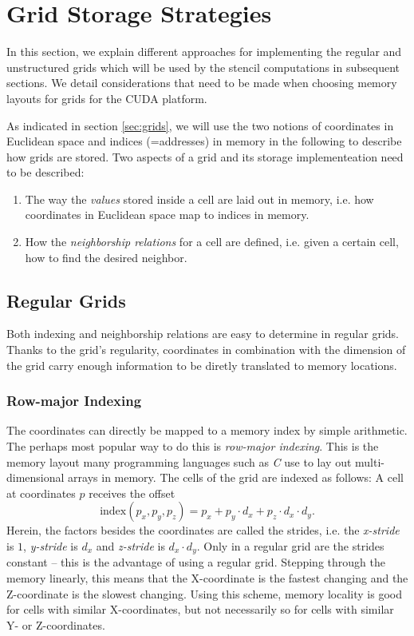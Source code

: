 \section{Grid Storage Strategies}				\label{sec:grid-implementations}

In this section, we explain different approaches for implementing the regular and unstructured grids which will be used by the stencil computations in subsequent sections. We detail considerations that need to be made when choosing memory layouts for grids for the CUDA platform.

As indicated in section \ref{sec:grids}, we will use the two notions of coordinates in Euclidean space and indices (=addresses) in memory in the following to describe how grids are stored. Two aspects of a grid and its storage implementeation need to be described:
\begin{enumerate}
	\item The way the \emph{values} stored inside a cell are laid out in memory, i.e. how coordinates in Euclidean space map to indices in memory.
	\item How the \emph{neighborship relations} for a cell are defined, i.e. given a certain cell, how to find the desired neighbor.
\end{enumerate}

\subsection{Regular Grids}

Both indexing and neighborship relations are easy to determine in regular grids. Thanks to the grid's regularity, coordinates in combination with the dimension of the grid carry enough information to be diretly translated to memory locations.

\subsubsection{Row-major Indexing}

The coordinates can directly be mapped to a memory index by simple arithmetic. The perhaps most popular way to do this is \emph{row-major indexing}. This is the memory layout many programming languages such as \emph{C} use to lay out multi-dimensional arrays in memory. The cells of the grid are indexed as follows: A cell at coordinates $p$ receives the offset
 $$\text{index}\left(p_x, p_y, p_z\right) = p_x + p_y \cdot d_x + p_z \cdot d_x \cdot d_y.$$
Herein, the factors besides the coordinates are called the strides, i.e. the \emph{x-stride} is $1$, \emph{y-stride} is $d_x$ and \emph{z-stride} is $d_x\cdot d_y$. Only in a regular grid are the strides constant -- this is the advantage of using a regular grid. Stepping through the memory linearly, this means that the X-coordinate is the fastest changing and the Z-coordinate is the slowest changing. Using this scheme, memory locality is good for cells with similar X-coordinates, but not necessarily so for cells with similar Y- or Z-coordinates.

